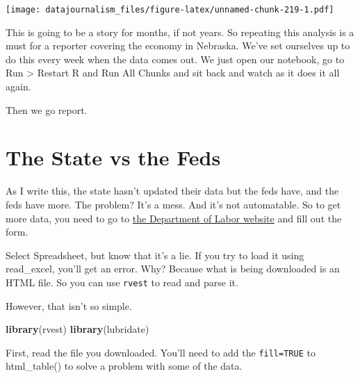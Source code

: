 \documentclass[]{book}
\newenvironment{Shaded}{\begin{snugshade}}{\end{snugshade}}
\newcommand{\DataTypeTok}[1]{\textcolor[rgb]{0.13,0.29,0.53}{#1}}
\newcommand{\KeywordTok}[1]{\textcolor[rgb]{0.13,0.29,0.53}{\textbf{#1}}}
\newcommand{\NormalTok}[1]{#1}
\newcommand{\OperatorTok}[1]{\textcolor[rgb]{0.81,0.36,0.00}{\textbf{#1}}}
\newcommand{\OtherTok}[1]{\textcolor[rgb]{0.56,0.35,0.01}{#1}}
\newcommand{\StringTok}[1]{\textcolor[rgb]{0.31,0.60,0.02}{#1}}
\begin{document}
\texttt{[image: datajournalism\_files/figure-latex/unnamed-chunk-219-1.pdf]}

This is going to be a story for months, if not years. So repeating this analysis is a must for a reporter covering the economy in Nebraska. We've set ourselves up to do this every week when the data comes out. We just open our notebook, go to Run \textgreater{} Restart R and Run All Chunks and sit back and watch as it does it all again.

Then we go report.

\hypertarget{the-state-vs-the-feds}{%
\section{The State vs the Feds}\label{the-state-vs-the-feds}}

As I write this, the state hasn't updated their data but the feds have, and the feds have more. The problem? It's a mess. And it's not automatable. So to get more data, you need to go to \href{https://oui.doleta.gov/unemploy/claims.asp}{the Department of Labor website} and fill out the form.

Select Spreadsheet, but know that it's a lie. If you try to load it using read\_excel, you'll get an error. Why? Because what is being downloaded is an HTML file. So you can use \texttt{rvest} to read and parse it.

However, that isn't so simple.

\begin{Shaded}
\begin{Highlighting}[]
\KeywordTok{library}\NormalTok{(rvest)}
\KeywordTok{library}\NormalTok{(lubridate)}
\end{Highlighting}
\end{Shaded}

First, read the file you downloaded. You'll need to add the \texttt{fill=TRUE} to html\_table() to solve a problem with some of the data.

\begin{Shaded}
\end{Shaded}
\end{document}
